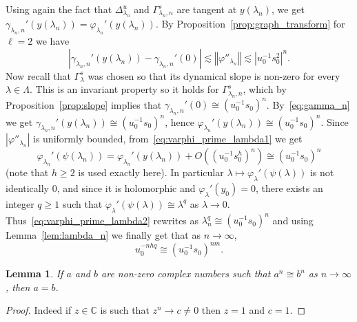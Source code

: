 \documentclass[11pt, oneside]{amsart}
\newcommand{\C}{\mathbb{C}}
\newcommand{\norm}[1]{\left\Vert#1\right\Vert}
\newcommand{\abs}[1]{\left\vert#1\right\vert}
\newcommand{\lrpar}[1]{\left(#1\right)}
\newcommand{\inv}{^{-1}}
\newtheorem{lem}[prop] {Lemma}
\theoremstyle{remark}
\theoremstyle{definition}
\theoremstyle{theorem}
\newcommand{\commentaire}[1]{}
\begin{document}
 Using again the fact that $\Delta^u_{\lambda_n}$ and 
 $\Gamma^s_{\lambda_n, n}$ are tangent  
at $y(\lambda_n)$, we get $\gamma_{\lambda_n,n}' (y(\lambda_n)) = \varphi_{\lambda_n}'(y(\lambda_n))$.
By Proposition~\ref{prop:graph_transform} for $\ell=2$ we have 
\begin{equation}\label{eq:gamma_n}
\abs{\gamma_{\lambda_n,n}' (y(\lambda_n))- \gamma_{\lambda_n,n}' (0)}\lesssim \norm{\varphi''_{\lambda_n}} \lesssim \abs{u_0\inv s_0^2}^n.
\end{equation}
Now recall that $\Gamma_\lambda^s$ was chosen so that its dynamical slope is non-zero for every $\lambda\in \Lambda$. This 
 is an invariant property so it holds for $\Gamma_{\lambda_n,n}^s$, which by Proposition~\ref{prop:slope}
 implies that 
 $\gamma_{\lambda_n,n}' (0)\cong (u_0\inv  s_0)^n$. 
 By~\eqref{eq:gamma_n} we get $\gamma_{\lambda_n,n}' (y(\lambda_n))\cong (u_0\inv s_0)^n$, hence 
 $\varphi_{\lambda_n}'(y(\lambda_n)) \cong (u_0\inv s_0)^n$. 
 Since  $\abs{\varphi''_{\lambda_n}}$ is uniformly bounded, 
 from~\eqref{eq:varphi_prime_lambda1} we get 
 \begin{equation}\label{eq:varphi_prime_lambda2}
 \varphi_{\lambda_n}' (\psi(\lambda_n))  =  \varphi_{\lambda_n}' (y(\lambda_n)) + O \lrpar{(u_0 \inv s_0^{h})^n}   \cong (u_0\inv  s_0)^n
 \end{equation}
 (note that   $h\geq 2$ is used exactly here).
 In particular $\lambda \mapsto \varphi_\lambda'(\psi(\lambda))$ is not identically 0, and since it is holomorphic and $\varphi_\lambda'(y_0) = 0$\commentaire{cf. Minor comment \#6}, there exists an integer $q\geq 1$ such 
 that $\varphi_\lambda'(\psi(\lambda))\cong \lambda^q$ as $\lambda\to 0$\commentaire{Major Remark \#1 (continued): the integer $q$ is introduced here}. Thus~\eqref{eq:varphi_prime_lambda2} rewrites as  
$\lambda_n^q\cong (u_0\inv  s_0)^n$ and using 
Lemma~\ref{lem:lambda_n} we finally get that as $n\to\infty$,
\begin{equation}\label{eq:su}
u_0^{-nhq}\cong (u_0\inv  s_0)^{nm}. 
\end{equation}

\begin{lem}
If $a$ and $b$ are non-zero complex numbers such that $a^n\cong b^n$ as $n\to\infty$,  then $a=b$. 
\end{lem}
\begin{proof}
Indeed if $z\in \C$ is such that $z^n\to c\neq 0$ then $z=1$ and $c=1$.  
\end{proof}
\end{document}
